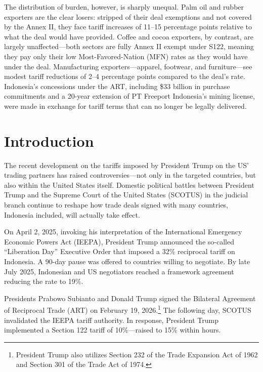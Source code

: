 \documentclass[12pt,a4paper]{article}
\begin{document}
The distribution of burden, however, is sharply unequal. Palm oil and rubber exporters are the clear losers: stripped of their deal exemptions and not covered by the Annex II, they face tariff increases of 11--15 percentage points relative to what the deal would have provided. Coffee and cocoa exporters, by contrast, are largely unaffected---both sectors are fully Annex II exempt under S122, meaning they pay only their low Most-Favored-Nation (MFN) rates as they would have under the deal. Manufacturing exporters---apparel, footwear, and furniture---see modest tariff reductions of 2--4 percentage points compared to the deal's rate. Indonesia's concessions under the ART, including \$33 billion in purchase commitments and a 20-year extension of PT Freeport Indonesia's mining license, were made in exchange for tariff terms that can no longer be legally delivered.

\newpage
\section{Introduction}

The recent development on the tariffs imposed by President Trump on the US' trading partners has raised controversies---not only in the targeted countries, but also within the United States itself. Domestic political battles between President Trump and the Supreme Court of the United States (SCOTUS) in the judicial branch continue to reshape how trade deals signed with many countries, Indonesia included, will actually take effect.

On April 2, 2025, invoking his interpretation of the International Emergency Economic Powers Act (IEEPA), President Trump announced the so-called ``Liberation Day'' Executive Order that imposed a 32\% reciprocal tariff on Indonesia. A 90-day pause was offered to countries willing to negotiate. By late July 2025, Indonesian and US negotiators reached a framework agreement reducing the rate to 19\%.

Presidents Prabowo Subianto and Donald Trump signed the Bilateral Agreement of Reciprocal Trade (ART) on February 19, 2026.\footnote{President Trump also utilizes Section 232 of the Trade Expansion Act of 1962 and Section 301 of the Trade Act of 1974.} The following day, SCOTUS invalidated the IEEPA tariff authority. In response, President Trump implemented a Section 122 tariff of 10\%---raised to 15\% within hours.
\end{document}
